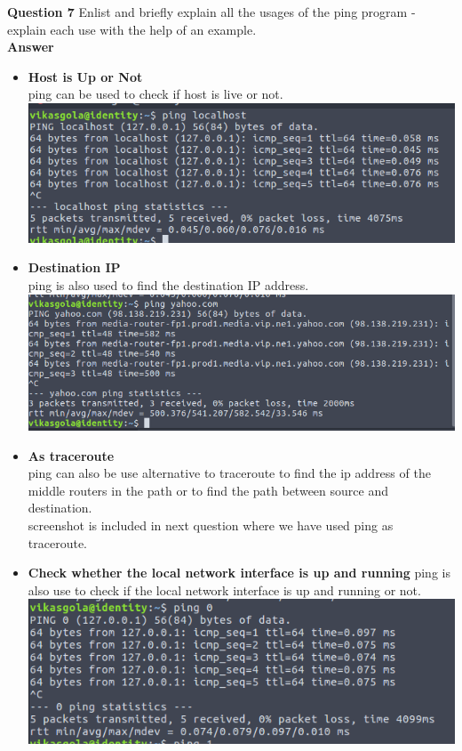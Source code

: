 \documentclass[14pt]{extarticle}
\begin{document}
    \noindent
    \textbf{\large Question 7}
    Enlist and briefly explain all the usages of the ping program - explain each use with the help of an
    example.\\[10pt]
    \textbf{\large Answer}
    \begin{itemize}
        \item \textbf{Host is Up or Not}\\
        ping can be used to check if host is live or not.
        \\
        \includegraphics[scale=0.5]{7_1}
        \item \textbf{Destination IP}\\
        ping is also used to find the destination IP address.
        \\
        \includegraphics[scale=0.5]{7_2}
        \item \textbf{As traceroute}\\
        ping can also be use alternative to traceroute to find the ip address of the middle routers in the path or to find the path between source and destination.
        \\screenshot is included in next question where we have used ping as traceroute.
        \item \textbf{Check whether the local network interface is up and running}
        ping is also use to check if the local network interface is up and running or not.\\
        \includegraphics[scale=0.5]{7_3}

\end{itemize}
\end{document}
